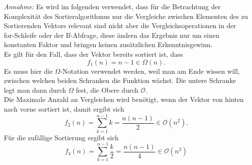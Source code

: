 \emph{Annahme:} Es wird im folgenden verwendet, dass für die Betrachtung der Komplexität des Sortieralgorithmus nur die Vergleiche zwischen Elementen des zu Sortierenden Vektors relevant sind nicht aber die Vergleichsoperationen in der for-Schleife oder der If-Abfrage, diese ändern das Ergebnis nur um einen konstanten Faktor und bringen keinen zusätzlichen Erkenntnisgewinn.\\
Es gilt für den Fall, dass der Vektor bereits sortiert ist, dass
\begin{equation}
  f_1(n)=n-1 \in\Omega(n).
\end{equation}
Es muss hier die $\Omega$-Notation verwendet werden, weil man am Ende wissen will, zwischen welchen beiden Schranken die Funktion wächst. Die untere Schranke legt man dann durch $\Omega$ fest, die Obere durch $\mathcal O$.\\
Die Maximale Anzahl an Vergleichen wird benötigt, wenn der Vektor von hinten nach vorne sortiert ist, damit ergibt sich
\begin{equation}
  f_2(n)=\sum_{k=1}^{n-1}k=\frac{n(n-1)}{2}\in \mathcal O(n^2).
\end{equation}
Für die zufällige Sortierung ergibt sich
\begin{equation}
  f_3(n)=\sum_{k=1}^{n-1}\frac{k}{2}=\frac{n(n-1)}{4}\in \mathcal O(n^2)
\end{equation}

